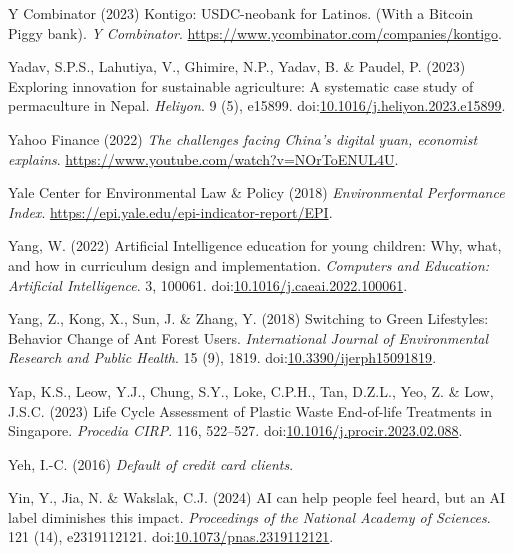 \documentclass[
  letterpaper,
  DIV=11,
  numbers=noendperiod]{scrartcl}
\newlength{\cslhangindent}
\newenvironment{CSLReferences}[2] %
 {\begin{list}{}{%
  \setlength{\itemindent}{0pt}
  \setlength{\leftmargin}{0pt}
  \setlength{\parsep}{0pt}
  \ifodd #1
   \setlength{\leftmargin}{\cslhangindent}
   \setlength{\itemindent}{-1\cslhangindent}
  \fi
  \setlength{\itemsep}{#2\baselineskip}}}
 {\end{list}}
\begin{document}
\begin{CSLReferences}{0}{1}
Y Combinator (2023) Kontigo: {USDC-neobank} for {Latinos}. ({With} a
{Bitcoin Piggy} bank). \emph{Y Combinator}.
\url{https://www.ycombinator.com/companies/kontigo}.

Yadav, S.P.S., Lahutiya, V., Ghimire, N.P., Yadav, B. \& Paudel, P.
(2023) Exploring innovation for sustainable agriculture: {A} systematic
case study of permaculture in {Nepal}. \emph{Heliyon}. 9 (5), e15899.
doi:\href{https://doi.org/10.1016/j.heliyon.2023.e15899}{10.1016/j.heliyon.2023.e15899}.

Yahoo Finance (2022) \emph{The challenges facing {China}'s digital yuan,
economist explains}. \url{https://www.youtube.com/watch?v=NOrToENUL4U}.

Yale Center for Environmental Law \& Policy (2018) \emph{Environmental
{Performance Index}}.
\url{https://epi.yale.edu/epi-indicator-report/EPI}.

Yang, W. (2022) Artificial {Intelligence} education for young children:
{Why}, what, and how in curriculum design and implementation.
\emph{Computers and Education: Artificial Intelligence}. 3, 100061.
doi:\href{https://doi.org/10.1016/j.caeai.2022.100061}{10.1016/j.caeai.2022.100061}.

Yang, Z., Kong, X., Sun, J. \& Zhang, Y. (2018) Switching to {Green
Lifestyles}: {Behavior Change} of {Ant Forest Users}.
\emph{International Journal of Environmental Research and Public
Health}. 15 (9), 1819.
doi:\href{https://doi.org/10.3390/ijerph15091819}{10.3390/ijerph15091819}.

Yap, K.S., Leow, Y.J., Chung, S.Y., Loke, C.P.H., Tan, D.Z.L., Yeo, Z.
\& Low, J.S.C. (2023) Life {Cycle Assessment} of {Plastic Waste
End-of-life Treatments} in {Singapore}. \emph{Procedia CIRP}. 116,
522--527.
doi:\href{https://doi.org/10.1016/j.procir.2023.02.088}{10.1016/j.procir.2023.02.088}.

Yeh, I.-C. (2016) \emph{Default of credit card clients}.

Yin, Y., Jia, N. \& Wakslak, C.J. (2024) {AI} can help people feel
heard, but an {AI} label diminishes this impact. \emph{Proceedings of
the National Academy of Sciences}. 121 (14), e2319112121.
doi:\href{https://doi.org/10.1073/pnas.2319112121}{10.1073/pnas.2319112121}.


\end{CSLReferences}
\end{document}

